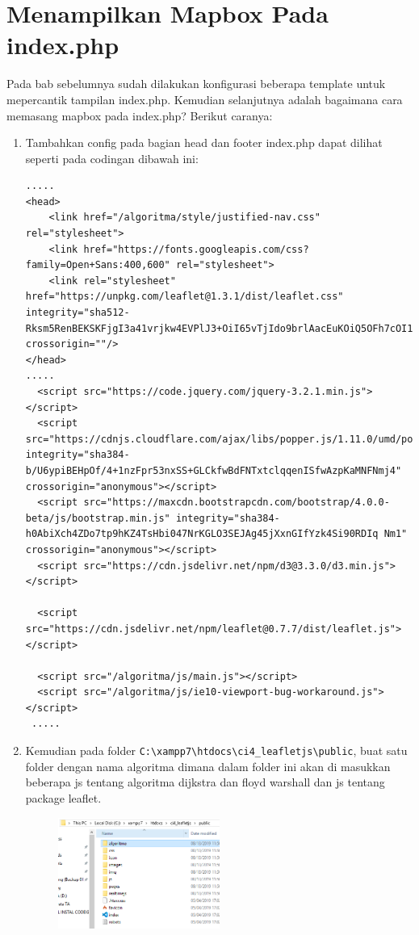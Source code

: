 \section{Menampilkan Mapbox Pada index.php} 
\label{7.2}
Pada bab sebelumnya sudah dilakukan konfigurasi beberapa template untuk mepercantik tampilan index.php. Kemudian selanjutnya adalah bagaimana cara memasang mapbox pada index.php? Berikut caranya:
\begin{enumerate}
    \item Tambahkan config pada bagian head dan footer index.php dapat dilihat seperti pada codingan dibawah ini:

\begin{lstlisting}[caption=Menampilkan Mapbox Leaflet JS di CodeIgniter 4]
.....
<head>
    <link href="/algoritma/style/justified-nav.css" rel="stylesheet">
    <link href="https://fonts.googleapis.com/css?family=Open+Sans:400,600" rel="stylesheet">
    <link rel="stylesheet" href="https://unpkg.com/leaflet@1.3.1/dist/leaflet.css" integrity="sha512-Rksm5RenBEKSKFjgI3a41vrjkw4EVPlJ3+OiI65vTjIdo9brlAacEuKOiQ5OFh7cOI1bkDwLqdLw3Zg0cRJAAQ==" crossorigin=""/>
</head>
.....
  <script src="https://code.jquery.com/jquery-3.2.1.min.js"></script>
  <script src="https://cdnjs.cloudflare.com/ajax/libs/popper.js/1.11.0/umd/popper.min.js" integrity="sha384-b/U6ypiBEHpOf/4+1nzFpr53nxSS+GLCkfwBdFNTxtclqqenISfwAzpKaMNFNmj4" crossorigin="anonymous"></script>
  <script src="https://maxcdn.bootstrapcdn.com/bootstrap/4.0.0-beta/js/bootstrap.min.js" integrity="sha384-h0AbiXch4ZDo7tp9hKZ4TsHbi047NrKGLO3SEJAg45jXxnGIfYzk4Si90RDIq Nm1" crossorigin="anonymous"></script>
  <script src="https://cdn.jsdelivr.net/npm/d3@3.3.0/d3.min.js"></script>
  
  <script src="https://cdn.jsdelivr.net/npm/leaflet@0.7.7/dist/leaflet.js"></script>

  <script src="/algoritma/js/main.js"></script>
  <script src="/algoritma/js/ie10-viewport-bug-workaround.js"></script>
 .....
\end{lstlisting}

    \item Kemudian pada folder \verb|C:\xampp7\htdocs\ci4_leafletjs\public|, buat satu folder dengan nama algoritma dimana dalam folder ini akan di masukkan beberapa js tentang algoritma dijkstra dan floyd warshall dan js tentang package leaflet.
    \vspace{5cm}
	\begin{figure}[!htbp]
		\centering
		\includegraphics[width=0.5\textwidth]{figures/LEAFLETJS/LJS2.PNG}
		\label{Leaflet2}
	\end{figure}
	

\end{enumerate}

